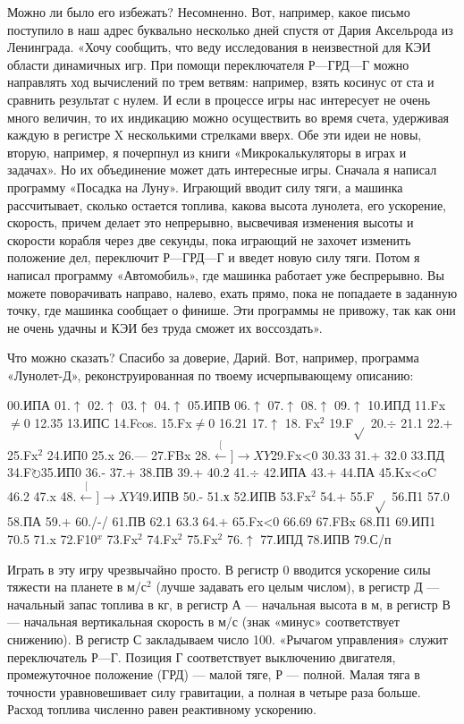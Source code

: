 \documentclass[11pt,a4paper,oneside]{article}
\def\XY{$\stackrel[\leftarrow]{\rightarrow}{XY}$}
\def\FO{F$\circlearrowright$}
\begin{document}
Можно ли было его избежать? Несомненно. Вот, например, какое письмо поступило в наш адрес буквально несколько дней спустя от Дария Аксельрода из Ленинграда. «Хочу сообщить, что веду исследования в неизвестной для КЭИ области динамичных игр. При помощи переключателя Р—ГРД—Г можно направлять ход вычислений по трем ветвям: например, взять косинус от ста и сравнить результат с нулем. И если в процессе игры нас интересует не очень много величин, то их индикацию можно осуществить во время счета, удерживая каждую в регистре X несколькими стрелками вверх. Обе эти идеи не новы, вторую, например, я почерпнул из книги «Микрокалькуляторы в играх и задачах». Но их объединение может дать интересные игры. Сначала я написал программу «Посадка на Луну». Играющий вводит силу тяги, а машинка рассчитывает, сколько остается топлива, какова высота лунолета, его ускорение, скорость, причем делает это непрерывно, высвечивая изменения высоты и скорости корабля через две секунды, пока играющий не захочет изменить положение дел, переключит Р—ГРД—Г и введет новую силу тяги. Потом я написал программу «Автомобиль», где машинка работает уже беспрерывно. Вы можете поворачивать направо, налево, ехать прямо, пока не попадаете в заданную точку, где машинка сообщает о финише. Эти программы не привожу, так как они не очень удачны и КЭИ без труда сможет их воссоздать».

Что можно сказать? Спасибо за доверие, Дарий. Вот, например, программа «Лунолет-Д», реконструированная по твоему исчерпывающему описанию:

00.ИПА 01.$\uparrow$ 02.$\uparrow$ 03.$\uparrow$ 04.$\uparrow$ 05.ИПВ 06.$\uparrow$ 07.$\uparrow$ 08.$\uparrow$ 09.$\uparrow$ 10.ИПД 11.Fx$\neq$0 12.35 13.ИПС 14.Fcos. 15.Fx$\neq$0 16.21 17.$\uparrow$ 18. Fx$^{2}$ 19.F$\sqrt{}$ 20.$\div$ 21.1 22.+ 25.Fx$^{2}$
24.ИП0 25.x 26.— 27.FBx 28.\XY 29.Fx<0 30.33 31.+ 32.0 33.ПД 34.\FO 35.ИП0 36.- 37.+ 38.ПВ 39.+ 40.2 41.$\div$ 42.ИПА 43.+ 44.ПА 45.Kx<oC 46.2 47.x 48.\XY 49.ИПВ 50.- 51.х 52.ИПВ 53.Fx$^{2}$ 54.+ 55.F$\sqrt{}$ 56.П1 57.0 58.ПА 59.+ 60./-/ 61.ПВ 62.1 63.3 64.+ 65.Fx<0
66.69 67.FBx 68.П1 69.ИП1 70.5 71.x 72.F10$^{x}$ 73.Fx$^{2}$
74.Fx$^{2}$ 75.Fx$^{2}$ 76.$\uparrow$ 77.ИПД 78.ИПВ 79.С/п

Играть в эту игру чрезвычайно просто. В регистр 0 вводится ускорение силы тяжести на планете в м/с$^{2}$ (лучше задавать его целым числом), в регистр Д — начальный запас топлива в кг, в регистр А — начальная высота в м, в регистр В — начальная вертикальная скорость в м/с (знак «минус» соответствует снижению). В регистр С закладываем число 100. «Рычагом управления» служит переключатель Р—Г. Позиция Г соответствует выключению двигателя, промежуточное положение (ГРД) — малой тяге, Р — полной. Малая тяга в точности уравновешивает силу гравитации, а полная в четыре раза больше. Расход топлива численно равен реактивному ускорению.
\end{document}
